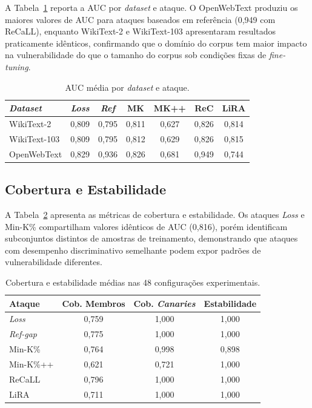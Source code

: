 \documentclass[
	12pt,				%
	openright,			%
	oneside,			%
	a4paper,			%
	english,			%
	french,				%
	spanish,			%
	brazil,				%
	]{abntex2}
\begin{document}
A Tabela~\ref{tab:dataset_ciarp} reporta a AUC por \textit{dataset} e ataque. O OpenWebText produziu os maiores valores de AUC para ataques baseados em referência (0,949 com ReCaLL), enquanto WikiText-2 e WikiText-103 apresentaram resultados praticamente idênticos, confirmando que o domínio do corpus tem maior impacto na vulnerabilidade do que o tamanho do corpus sob condições fixas de \textit{fine-tuning}.

\begin{table}[H]
\centering
\caption{AUC média por \textit{dataset} e ataque.}
\label{tab:dataset_ciarp}
\begin{tabular}{lcccccc}
\toprule
\textbf{\textit{Dataset}} & \textbf{\textit{Loss}} & \textbf{\textit{Ref}} & \textbf{MK} & \textbf{MK++} & \textbf{ReC} & \textbf{LiRA} \\
\midrule
WikiText-2   & 0,809 & 0,795 & 0,811 & 0,627 & 0,826 & 0,814 \\
WikiText-103 & 0,809 & 0,795 & 0,812 & 0,629 & 0,826 & 0,815 \\
OpenWebText  & 0,829 & 0,936 & 0,826 & 0,681 & 0,949 & 0,744 \\
\bottomrule
\end{tabular}
\end{table}

\subsection{Cobertura e Estabilidade}

A Tabela~\ref{tab:coverage_ciarp} apresenta as métricas de cobertura e estabilidade. Os ataques \textit{Loss} e Min-K\% compartilham valores idênticos de AUC (0,816), porém identificam subconjuntos distintos de amostras de treinamento, demonstrando que ataques com desempenho discriminativo semelhante podem expor padrões de vulnerabilidade diferentes.

\begin{table}[H]
\centering
\caption{Cobertura e estabilidade médias nas 48 configurações experimentais.}
\label{tab:coverage_ciarp}
\begin{tabular}{lccc}
\toprule
\textbf{Ataque} & \textbf{Cob. Membros} & \textbf{Cob. \textit{Canaries}} & \textbf{Estabilidade} \\
\midrule
\textit{Loss}       & 0,759 & 1,000 & 1,000 \\
\textit{Ref-gap}    & 0,775 & 1,000 & 1,000 \\
Min-K\%    & 0,764 & 0,998 & 0,898 \\
Min-K\%++  & 0,621 & 0,721 & 1,000 \\
ReCaLL     & 0,796 & 1,000 & 1,000 \\
LiRA       & 0,711 & 1,000 & 1,000 \\
\bottomrule
\end{tabular}
\end{table}
\end{document}

